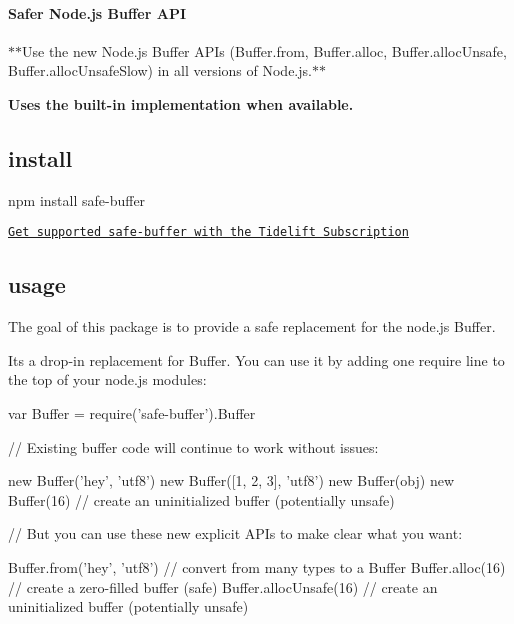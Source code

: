 \paragraph*{Safer Node.\+js Buffer A\+PI}

$\ast$$\ast$\+Use the new Node.\+js Buffer A\+P\+Is ({\ttfamily Buffer.\+from}, {\ttfamily Buffer.\+alloc}, {\ttfamily Buffer.\+alloc\+Unsafe}, {\ttfamily Buffer.\+alloc\+Unsafe\+Slow}) in all versions of Node.\+js.$\ast$$\ast$

{\bfseries Uses the built-\/in implementation when available.}

\subsection*{install}


\begin{DoxyCode}
npm install safe-buffer
\end{DoxyCode}


\href{https://tidelift.com/subscription/pkg/npm-safe-buffer?utm_source=npm-safe-buffer&utm_medium=referral&utm_campaign=readme}{\tt Get supported safe-\/buffer with the Tidelift Subscription}

\subsection*{usage}

The goal of this package is to provide a safe replacement for the node.\+js {\ttfamily Buffer}.

It\textquotesingle{}s a drop-\/in replacement for {\ttfamily Buffer}. You can use it by adding one {\ttfamily require} line to the top of your node.\+js modules\+:


\begin{DoxyCode}
var Buffer = require('safe-buffer').Buffer

// Existing buffer code will continue to work without issues:

new Buffer('hey', 'utf8')
new Buffer([1, 2, 3], 'utf8')
new Buffer(obj)
new Buffer(16) // create an uninitialized buffer (potentially unsafe)

// But you can use these new explicit APIs to make clear what you want:

Buffer.from('hey', 'utf8') // convert from many types to a Buffer
Buffer.alloc(16) // create a zero-filled buffer (safe)
Buffer.allocUnsafe(16) // create an uninitialized buffer (potentially unsafe)
\end{DoxyCode}


